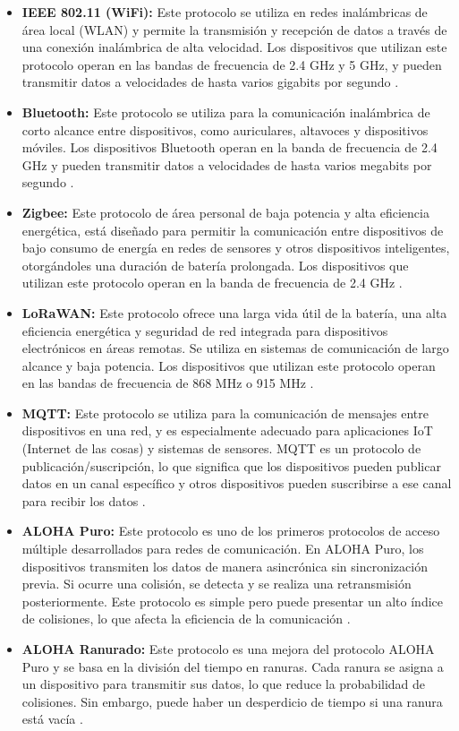 \begin{itemize}
    \item \textbf{IEEE 802.11 (WiFi):} Este protocolo se utiliza en redes inalámbricas de área local (WLAN) y permite la transmisión y recepción de datos a través de una conexión inalámbrica de alta velocidad. Los dispositivos que utilizan este protocolo operan en las bandas de frecuencia de 2.4 GHz y 5 GHz, y pueden transmitir datos a velocidades de hasta varios gigabits por segundo \cite{53}.
    \item \textbf{Bluetooth:} Este protocolo se utiliza para la comunicación inalámbrica de corto alcance entre dispositivos, como auriculares, altavoces y dispositivos móviles. Los dispositivos Bluetooth operan en la banda de frecuencia de 2.4 GHz y pueden transmitir datos a velocidades de hasta varios megabits por segundo \cite{54}.
    \item \textbf{Zigbee:} Este protocolo de área personal de baja potencia y alta eficiencia energética, está diseñado para permitir la comunicación entre dispositivos de bajo consumo de energía en redes de sensores y otros dispositivos inteligentes, otorgándoles una duración de batería prolongada. Los dispositivos que utilizan este protocolo operan en la banda de frecuencia de 2.4 GHz \cite{55}.
    \item \textbf{LoRaWAN:} Este protocolo ofrece una larga vida útil de la batería, una alta eficiencia energética y seguridad de red integrada para dispositivos electrónicos en áreas remotas. Se utiliza en sistemas de comunicación de largo alcance y baja potencia. Los dispositivos que utilizan este protocolo operan en las bandas de frecuencia de 868 MHz o 915 MHz \cite{56}.
    \item \textbf{MQTT:} Este protocolo se utiliza para la comunicación de mensajes entre dispositivos en una red, y es especialmente adecuado para aplicaciones IoT (Internet de las cosas) y sistemas de sensores. MQTT es un protocolo de publicación/suscripción, lo que significa que los dispositivos pueden publicar datos en un canal específico y otros dispositivos pueden suscribirse a ese canal para recibir los datos \cite{57}.
    \item \textbf{ALOHA Puro:} Este protocolo es uno de los primeros protocolos de acceso múltiple desarrollados para redes de comunicación. En ALOHA Puro, los dispositivos transmiten los datos de manera asincrónica sin sincronización previa. Si ocurre una colisión, se detecta y se realiza una retransmisión posteriormente. Este protocolo es simple pero puede presentar un alto índice de colisiones, lo que afecta la eficiencia de la comunicación \cite{58}.
    \item \textbf{ALOHA Ranurado:} Este protocolo es una mejora del protocolo ALOHA Puro y se basa en la división del tiempo en ranuras. Cada ranura se asigna a un dispositivo para transmitir sus datos, lo que reduce la probabilidad de colisiones. Sin embargo, puede haber un desperdicio de tiempo si una ranura está vacía \cite{59}.
\end{itemize}


